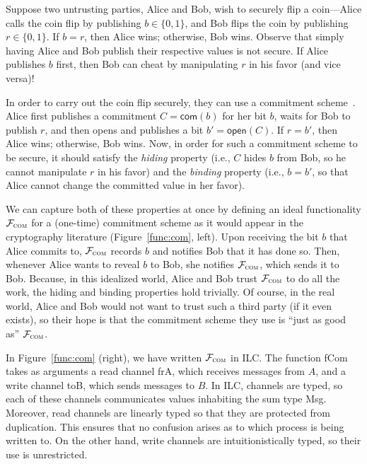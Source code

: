  Suppose two untrusting parties, Alice
and Bob, wish to securely flip a coin---Alice calls the coin flip by publishing $b
\in \{ 0, 1\}$, and Bob flips the coin by publishing $r \in \{0, 1\}$. If $b = r$,
then Alice wins; otherwise, Bob wins. Observe that simply having Alice and Bob
publish their respective values is not secure. If Alice publishes $b$ first,
then Bob can cheat by manipulating $r$ in his favor (and vice versa)!

In order to carry out the coin flip securely, they can use a commitment
scheme~\cite{brassard1988minimum}. Alice first publishes a commitment $C =
\mathsf{com}(b)$ for her bit $b$, waits for Bob to publish $r$, and then opens
and publishes a bit $b' = \mathsf{open}(C)$. If $r = b'$, then Alice wins;
otherwise, Bob wins.  Now, in order for such a commitment scheme to be secure,
it should satisfy the \emph{hiding} property (i.e., $C$ hides $b$ from Bob, so
he cannot manipulate $r$ in his favor) and the \emph{binding} property (i.e.,
$b=b'$, so that Alice cannot change the committed value in her favor).\smallskip

 We can capture both of these properties at
once by defining an ideal functionality $\mathcal{{F}}_{\textsc{com}}$ for a (one-time)
commitment scheme as it would appear in the cryptography literature
(Figure~\ref{func:com}, left). Upon receiving the bit $b$ that Alice commits to,
$\mathcal{{F}}_{\textsc{com}}$ records $b$ and notifies Bob that it has done so. Then,
whenever Alice wants to reveal $b$ to Bob, she notifies $\mathcal{{F}}_{\textsc{com}}$,
which sends it to Bob. Because, in this idealized world, Alice and Bob trust
$\mathcal{{F}}_{\textsc{com}}$ to do all the work, the hiding and binding properties
hold trivially. Of course, in the real world, Alice and Bob would not want to
trust such a third party (if it even exists), so their hope is that the
commitment scheme they use is ``just as good as''
$\mathcal{{F}}_{\textsc{com}}$.\smallskip

 In Figure~\ref{func:com} (right), we
have written $\mathcal{{F}}_{\textsc{com}}$ in ILC. The function \textsf{fCom} takes as
arguments a read channel \textsf{frA}, which receives messages from $A$, and a
write channel \textsf{toB}, which sends messages to $B$. In ILC, channels are
typed, so each of these channels communicates values inhabiting the sum type
\textsf{Msg}. Moreover, read channels are linearly typed so that they are
protected from duplication. This ensures that no confusion arises as to which
process is being written to. On the other hand, write channels are
intuitionistically typed, so their use is unrestricted.


